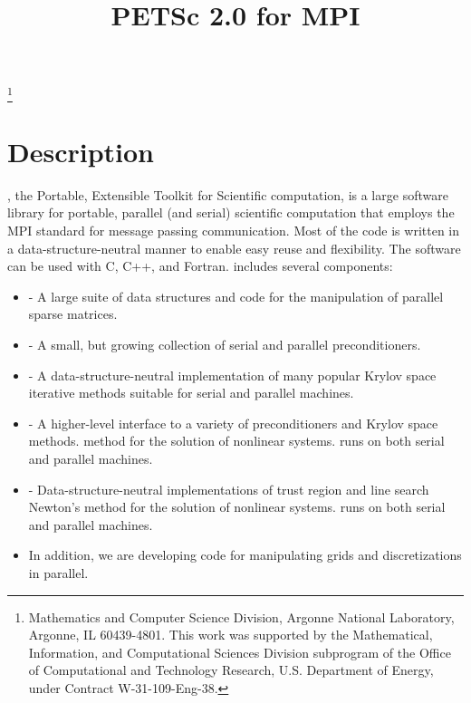 \pagestyle{empty}

\pagestyle{empty}
\title{PETSc 2.0 for MPI}
\thanks{Mathematics and Computer Science Division,
Argonne National Laboratory,
Argonne, IL 60439-4801.
This work was supported by the Mathematical,
        Information, and Computational Sciences Division subprogram of
        the Office of Computational and Technology Research,
        U.S. Department of Energy, under Contract W-31-109-Eng-38.}

\date{}
\maketitle

\section*{Description}

, the Portable, Extensible Toolkit for Scientific computation,
is a large software library for portable, parallel (and serial)
scientific computation that employs the MPI standard for message
passing communication.  Most of the code is written in a
data-structure-neutral manner to enable easy reuse and flexibility.
The  software can be used with C, C++, and Fortran.
 includes several components:
\begin{itemize}
\item {} - A large suite of data structures and code
      for the manipulation of parallel sparse matrices.
\item {} - A small, but growing collection of serial and parallel 
      preconditioners.
\item {} - A data-structure-neutral implementation of
      many popular Krylov space iterative methods suitable for 
      serial and parallel machines.
\item {} - A higher-level interface to a variety
      of preconditioners and Krylov space methods.
      method for the solution of nonlinear systems.  runs 
      on both serial and parallel machines.  
\item {} - Data-structure-neutral 
      implementations of trust region and line search Newton's 
      method for the solution of nonlinear systems.  runs 
      on both serial and parallel machines.  
\item In addition, we are developing code for manipulating grids
      and discretizations in parallel.
\end{itemize}

